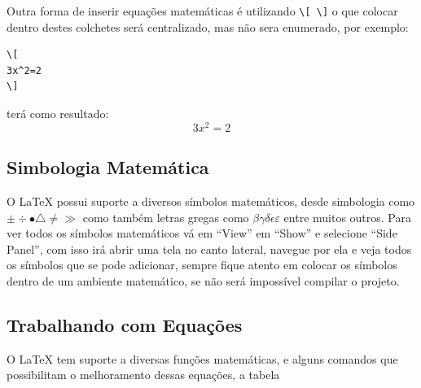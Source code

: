 Outra forma de inserir equações matemáticas é utilizando \lstinline|\[ \]| o que colocar dentro destes colchetes será centralizado, mas não sera enumerado, por exemplo:
\begin{lstlisting}
\[
3x^2=2
\]
\end{lstlisting}
terá como resultado:
\[
3x^2=2
\]
\subsection{Simbologia Matemática}
O LaTeX possui suporte a diversos símbolos matemáticos, desde simbologia como $\pm \div \bullet \bigtriangleup \neq \gg$ como também letras gregas como $\beta \gamma \delta \epsilon \varepsilon$ entre muitos outros. Para ver todos os símbolos matemáticos vá em ``View'' em ``Show'' e selecione ``Side Panel'', com isso irá abrir uma tela no canto lateral, navegue por ela e veja todos os símbolos que se pode adicionar, sempre fique atento em colocar os símbolos dentro de um ambiente matemático, se não será impossível compilar o projeto.
\subsection{Trabalhando com Equações}
O LaTeX tem suporte a diversas funções matemáticas, e alguns comandos que possibilitam o melhoramento dessas equações, a tabela

\begin{table}[htb]
\end{table}


